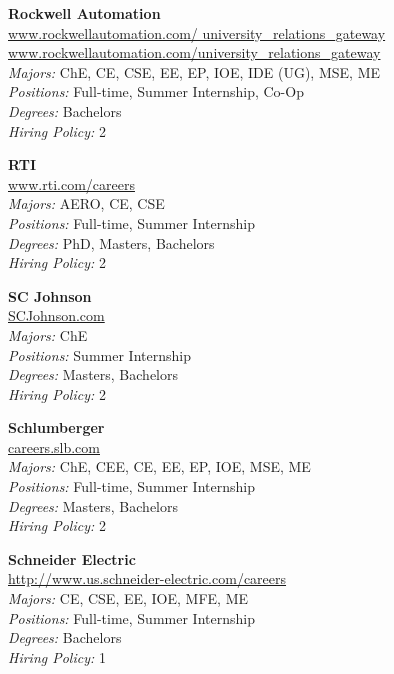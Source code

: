 \documentclass[twoside]{article}
\begin{document}
\begin{center}
\begin{multicols}{3}
\begin{minipage}{.9\columnwidth}{\Large\bf Rockwell Automation }\\
	\url{www.rockwellautomation.com/ university_relations_gateway www.rockwellautomation.com/university_relations_gateway}\\
	\emph{Majors:} ChE, CE, CSE, EE, EP, IOE, IDE (UG), MSE, ME\\
	\emph{Positions:} Full-time, Summer Internship, Co-Op\\
	\emph{Degrees:} Bachelors\\
	\emph{Hiring Policy:} 2\\
\end{minipage}
 
\begin{minipage}{.9\columnwidth}{\Large\bf RTI }\\
	\url{www.rti.com/careers}\\
	\emph{Majors:} AERO, CE, CSE\\
	\emph{Positions:} Full-time, Summer Internship\\
	\emph{Degrees:} PhD, Masters, Bachelors\\
	\emph{Hiring Policy:} 2\\
\end{minipage}
 
\begin{minipage}{.9\columnwidth}{\Large\bf SC Johnson }\\
	\url{SCJohnson.com}\\
	\emph{Majors:} ChE\\
	\emph{Positions:} Summer Internship\\
	\emph{Degrees:} Masters, Bachelors\\
	\emph{Hiring Policy:} 2\\
\end{minipage}
 
\begin{minipage}{.9\columnwidth}{\Large\bf Schlumberger }\\
	\url{careers.slb.com}\\
	\emph{Majors:} ChE, CEE, CE, EE, EP, IOE, MSE, ME\\
	\emph{Positions:} Full-time, Summer Internship\\
	\emph{Degrees:} Masters, Bachelors\\
	\emph{Hiring Policy:} 2\\
\end{minipage}
 
\begin{minipage}{.9\columnwidth}{\Large\bf Schneider Electric }\\
	\url{http://www.us.schneider-electric.com/careers}\\
	\emph{Majors:} CE, CSE, EE, IOE, MFE, ME\\
	\emph{Positions:} Full-time, Summer Internship\\
	\emph{Degrees:} Bachelors\\
	\emph{Hiring Policy:} 1\\
\end{minipage}
 

\end{multicols}
\end{center}
\end{document}
